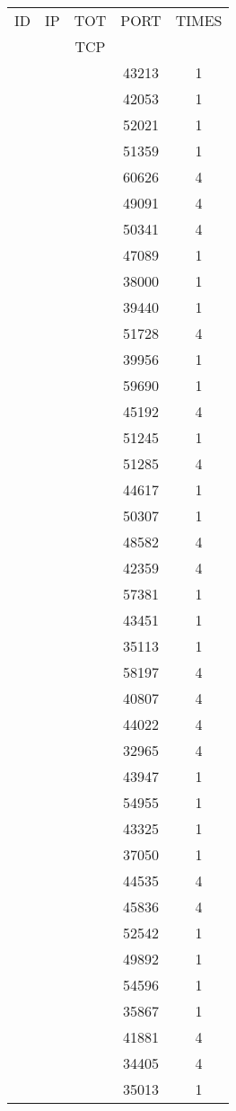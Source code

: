 \documentclass[a4paper]{scrartcl}
\begin{document}
\begin{minipage}[b]{0.5\linewidth}
\begin{tabular}{| c | c | c | c | c |}
\hline
ID & IP & TOT & PORT & TIMES \\ 
   &    & TCP &      &       \\ 
\hline
& & & 43213 & 1 \\ & & & 42053 & 1 \\ & & & 52021 & 1 \\ & & & 51359 & 1 \\ & & & 60626 & 4 \\ & & & 49091 & 4 \\ & & & 50341 & 4 \\ & & & 47089 & 1 \\ & & & 38000 & 1 \\ & & & 39440 & 1 \\ & & & 51728 & 4 \\ & & & 39956 & 1 \\ & & & 59690 & 1 \\ & & & 45192 & 4 \\ & & & 51245 & 1 \\ & & & 51285 & 4 \\ & & & 44617 & 1 \\ & & & 50307 & 1 \\ & & & 48582 & 4 \\ & & & 42359 & 4 \\ & & & 57381 & 1 \\ & & & 43451 & 1 \\ & & & 35113 & 1 \\ & & & 58197 & 4 \\ & & & 40807 & 4 \\ & & & 44022 & 4 \\ & & & 32965 & 4 \\ & & & 43947 & 1 \\ & & & 54955 & 1 \\ & & & 43325 & 1 \\ & & & 37050 & 1 \\ & & & 44535 & 4 \\ & & & 45836 & 4 \\ & & & 52542 & 1 \\ & & & 49892 & 1 \\ & & & 54596 & 1 \\ & & & 35867 & 1 \\ & & & 41881 & 4 \\ & & & 34405 & 4 \\ & & & 35013 & 1 \\ \hline\end{tabular}\end{minipage} \hfill\begin{minipage}[b]{0.5\linewidth}\begin{tabular}{| c | c | c | c | c |}

\end{tabular}
\end{minipage}
\end{document}
